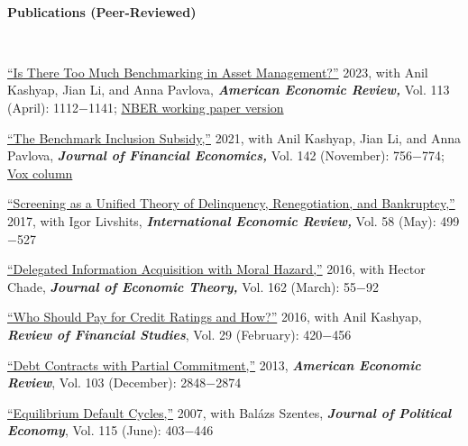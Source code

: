 \documentclass[11pt]{article}
\begin{document}
\ \
\medskip

\textbf{Publications (Peer-Reviewed)}

\ \

\href{http://www.public.asu.edu/~nkovrijn/BAM.pdf}{``Is There Too Much Benchmarking in Asset Management?''} 2023, with  Anil Kashyap, Jian Li, and Anna Pavlova, {\bf \textit{American Economic Review,}}  Vol. 113 (April): 1112$-$1141; \href{https://www.nber.org/system/files/working_papers/w28020/w28020.pdf}{NBER working paper version}
\bigskip

\href{http://www.public.asu.edu/~nkovrijn/subsidy.pdf}{``The Benchmark Inclusion Subsidy,''} 2021, with  Anil Kashyap, Jian Li, and Anna Pavlova,  {\bf \emph{Journal of Financial Economics, }} Vol. 142 (November): 756$-$774; \href{https://cepr.org/voxeu/columns/why-asset-managers-create-subsidies-certain-firms}{Vox
                column}



\bigskip

\href{http://www.public.asu.edu/~nkovrijn/screening.pdf}{``Screening as a Unified Theory of Delinquency, Renegotiation, and Bankruptcy,''} 2017, with Igor Livshits,  {\bf \textit{International Economic Review,} }Vol. 58 (May): 499$-$527

\bigskip







\href{http://www.public.asu.edu/~nkovrijn/infoacquisition.pdf}{``Delegated Information Acquisition with Moral Hazard,''} 2016, with Hector Chade, {\bf \textit{Journal of Economic Theory,}} Vol. 162 (March): 55$-$92

\bigskip
\href{http://www.public.asu.edu/~nkovrijn/cra.pdf}{``Who Should Pay for Credit Ratings and How?''} 2016, with Anil Kashyap, {\bf \textit{Review of Financial Studies}}, Vol. 29 (February): 420$-$456


\bigskip
\href{http://www.public.asu.edu/~nkovrijn/partial.pdf}{``Debt Contracts with Partial Commitment,''} 2013, {\bf \textit{American Economic Review}}, Vol. 103 (December): 2848$-$2874

\bigskip



\href{http://www.public.asu.edu/~nkovrijn/cycles.pdf}{``Equilibrium Default Cycles,''} 2007, with Bal\'{a}zs Szentes, {\bf \textit{Journal of Political Economy}},  Vol. 115 (June): 403$-$446

\ \ 


\medskip
\end{document}
